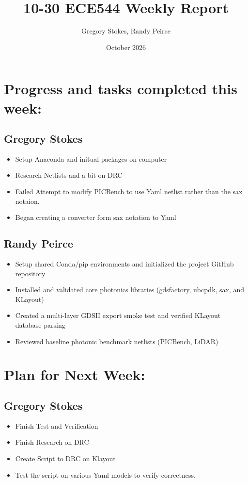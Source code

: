 \documentclass{article}
\title{10-30 ECE544 Weekly Report}
\author{Gregory Stokes, Randy Peirce}
\date{October 2026}
\begin{document}
\maketitle

\section{Progress and tasks completed this week:}
\subsection{Gregory Stokes}
    \begin{itemize}
        \item Setup Anaconda and initual packages on computer
        \item Research Netlists and a bit on DRC
        \item Failed Attempt to modify PICBench to use Yaml netlist rather than the sax notaion.
        \item Began creating a converter form sax notation to Yaml
    \end{itemize}
\subsection{Randy Peirce}
    \begin{itemize}
        \item Setup shared Conda/pip environments and initialized the project GitHub repository
        \item Installed and validated core photonics libraries (gdsfactory, ubcpdk, sax, and KLayout)
        \item Created a multi-layer GDSII export smoke test and verified KLayout database parsing
        \item Reviewed baseline photonic benchmark netlists (PICBench, LiDAR)
    \end{itemize}

\section{Plan for Next Week:}
\subsection{Gregory Stokes}
    \begin{itemize}
        \item Finish Test and Verification
        \item Finish Research on DRC
        \item Create Script to DRC on Klayout
        \item Test the script on various Yaml models to verify correctness.
    \end{itemize}
\end{document}
